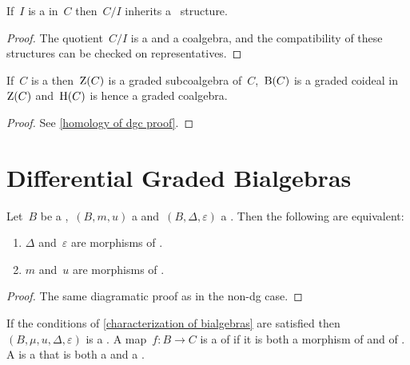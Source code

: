 \documentclass[a4paper,10pt,headings=standardclasses]{scrartcl}
\begin{document}
\begin{lemma}
  \label{quotient of dgc}
  If~$I$ is a {\dgci} in~$C$ then~$C/I$ inherits a~{\dgc} structure.
\end{lemma}

\begin{proof}
  The quotient~$C/I$ is a {\dgvs} and a coalgebra, and the compatibility of these structures can be checked on representatives.
\end{proof}

\begin{proposition}
  \label{homology of dgc}
  If~$C$ is a {\dgc} then~$\operatorname{Z}(C)$ is a graded subcoalgebra of~$C$,~$\operatorname{B}(C)$ is a graded coideal in~$\operatorname{Z}(C)$ and~$\operatorname{H}(C)$ is hence a graded coalgebra.
\end{proposition}

\begin{proof}
  See \cref{homology of dgc proof}.
\end{proof}






\section{Differential Graded Bialgebras}

\begin{lemma}
  \label{characterization of bialgebras}
  Let~$B$ be a {\dgv},~$(B, m, u)$ a {\dga} and~$(B, \Delta, \varepsilon)$ a {\dgc}.
  Then the following are equivalent:
  \begin{enumerate}
    \item
      $\Delta$ and~$\varepsilon$ are morphisms of {\dgas}.
    \item
      $m$ and~$u$ are morphisms of {\dgcs}.
  \end{enumerate}
\end{lemma}

\begin{proof}
  The same diagramatic proof as in the non-dg case.
\end{proof}

\begin{definition}
  If the conditions of \cref{characterization of bialgebras} are satisfied then~$(B, \mu, u, \Delta, \varepsilon)$ is a {\dgb}.
  A map~$f \colon B \to C$ is a  of {\dgbs} if it is both a morphism of {\dgas} and of {\dgcs}.
  A  is a {\dgsub} that is both a {\dgi} and a {\dgci}.
\end{definition}
\end{document}

